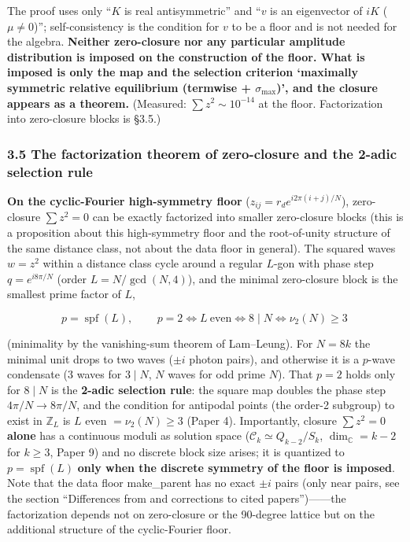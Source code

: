 \documentclass[
  a4paper,
]{ltjsarticle}
\begin{document}
The proof uses only ``\(K\) is real antisymmetric'' and ``\(v\) is an
eigenvector of \(iK\) (\(\mu\neq0\))''; self-consistency is the
condition for \(v\) to be a floor and is not needed for the algebra.
\textbf{Neither zero-closure nor any particular amplitude distribution
is imposed on the construction of the floor. What is imposed is only the
map and the selection criterion `maximally symmetric relative
equilibrium (termwise + \(\sigma_{\max}\))', and the closure appears as
a theorem.} (Measured: \(\sum z^2\sim10^{-14}\) at the floor.
Factorization into zero-closure blocks is §3.5.)

\subsubsection{3.5 The factorization theorem of zero-closure and the
2-adic selection
rule}\label{the-factorization-theorem-of-zero-closure-and-the-2-adic-selection-rule}

\textbf{On the cyclic-Fourier high-symmetry floor}
(\(z_{ij}=r_d e^{i2\pi(i+j)/N}\)), zero-closure \(\sum z^2=0\) can be
exactly factorized into smaller zero-closure blocks (this is a
proposition about this high-symmetry floor and the root-of-unity
structure of the same distance class, not about the data floor in
general). The squared waves \(w=z^2\) within a distance class cycle
around a regular \(L\)-gon with phase step \(q=e^{i8\pi/N}\) (order
\(L=N/\gcd(N,4)\)), and the minimal zero-closure block is the smallest
prime factor of \(L\),

\[p=\operatorname{spf}(L),\qquad \boxed{\,p=2\iff L\ \text{even}\iff 8\mid N\iff \nu_2(N)\ge3\,}\]

(minimality by the vanishing-sum theorem of Lam--Leung). For \(N=8k\)
the minimal unit drops to two waves (\(\pm i\) photon pairs), and
otherwise it is a \(p\)-wave condensate (3 waves for \(3\mid N\), \(N\)
waves for odd prime \(N\)). That \(p=2\) holds only for \(8\mid N\) is
the \textbf{2-adic selection rule}: the square map doubles the phase
step \(4\pi/N\to8\pi/N\), and the condition for antipodal points (the
order-2 subgroup) to exist in \(\mathbb Z_L\) is \(L\) even
\(=\nu_2(N)\ge3\) (Paper 4). Importantly, closure \(\sum z^2=0\)
\textbf{alone} has a continuous moduli as solution space
(\(\mathcal C_k\simeq Q_{k-2}/S_k\), \(\dim_{\mathbb C}=k-2\) for
\(k\ge3\), Paper 9) and no discrete block size arises; it is quantized
to \(p=\operatorname{spf}(L)\) \textbf{only when the discrete symmetry
of the floor is imposed}. Note that the data floor make\_parent has no
exact \(\pm i\) pairs (only near pairs, see the section ``Differences
from and corrections to cited papers'')------the factorization depends
not on zero-closure or the 90-degree lattice but on the additional
structure of the cyclic-Fourier floor.
\end{document}
